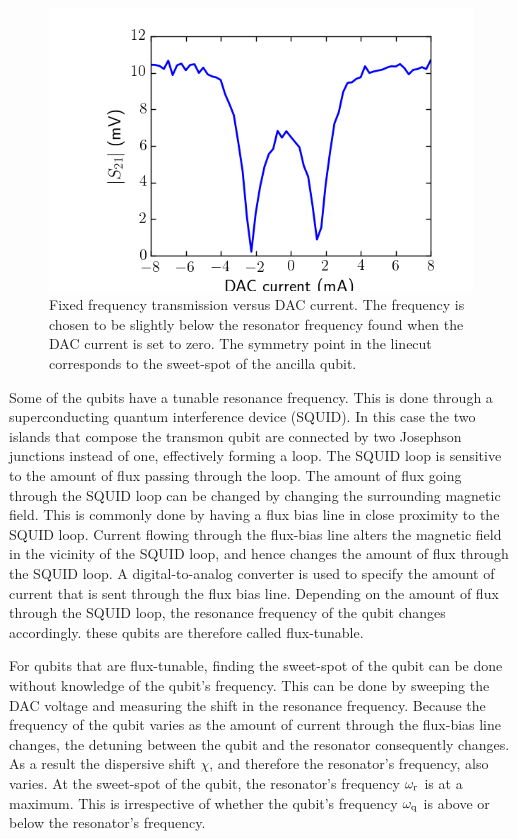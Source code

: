         \begin{figure}[tb]
          \centering
          \includegraphics[width=.6\linewidth]{../Figures/Qubit characterization/Resonator vs DAC linecut.png}
          \caption{Fixed frequency transmission versus DAC current. The frequency is chosen to be slightly below the resonator frequency found when the DAC current is set to zero. The symmetry point in the linecut corresponds to the sweet-spot of the ancilla qubit.}
          \label{fig:figure1}
        \end{figure}
        Some of the qubits have a tunable resonance frequency. This is done through a superconducting quantum interference device (SQUID). In this case the two islands that compose the transmon qubit are connected by two Josephson junctions instead of one, effectively forming a loop. The SQUID loop is sensitive to the amount of flux passing through the loop. The amount of flux going through the SQUID loop can be changed by changing the surrounding magnetic field. This is commonly done by having a flux bias line in close proximity to the SQUID loop. Current flowing through the flux-bias line alters the magnetic field in the vicinity of the SQUID loop, and hence changes the amount of flux through the SQUID loop. A digital-to-analog converter is used to specify the amount of current that is sent through the flux bias line. Depending on the amount of flux through the SQUID loop, the resonance frequency of the qubit changes accordingly. these qubits are therefore called flux-tunable.

        For qubits that are flux-tunable, finding the sweet-spot of the qubit can be done without knowledge of the qubit's frequency. This can be done by sweeping the DAC voltage and measuring the shift in the resonance frequency. Because the frequency of the qubit varies as the amount of current through the flux-bias line changes, the detuning between the qubit and the resonator consequently changes. As a result the dispersive shift $\chi$, and therefore the resonator's frequency, also varies. At the sweet-spot of the qubit, the resonator's frequency $\omega_\text{r}$ is at a maximum. This is irrespective of whether the qubit's frequency $\omega_\text{q}$ is above or below the resonator's frequency.

